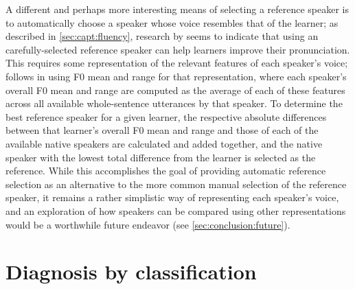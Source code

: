 		A different and perhaps more interesting means of selecting a reference speaker is to automatically choose a speaker whose voice resembles
that of the learner; as described in \cref{sec:capt:fluency}, research by \textcite{Probst2002} seems to indicate that using an carefully-selected reference speaker can help learners improve their pronunciation. 
	This requires some representation of the relevant features of each speaker's voice;  follows \textcite{Probst2002} in using F0 mean and range for that representation, where each speaker's overall F0 mean and range are computed as the average of each of these features across all available whole-sentence utterances by that speaker. To determine the best reference speaker for a given learner, the respective absolute differences between that learner's overall F0 mean and range and those of each of the available native speakers are calculated and added together, and the native speaker with the lowest total difference from the learner is selected as the reference. While this accomplishes the goal of providing automatic reference selection as an alternative to the more common manual selection of the reference speaker, it remains a rather simplistic way of representing each speaker's voice, and an exploration of how speakers can be compared using other representations would be a worthwhile future endeavor (see \cref{sec:conclusion:future}).


	
	

	\section{Diagnosis by classification}
	\label{sec:diag:classification}
	
